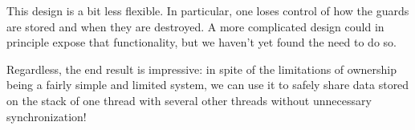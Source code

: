 This design is a bit less flexible. In particular, one loses control of how
the guards are stored and when they are destroyed. A more complicated design
could in principle expose that functionality, but we haven't yet found the need
to do so.

Regardless, the end result is impressive: in spite of the limitations of ownership
being a fairly simple and limited system, we can use it to safely share data stored
on the stack of one thread with several other threads without unnecessary
synchronization!

